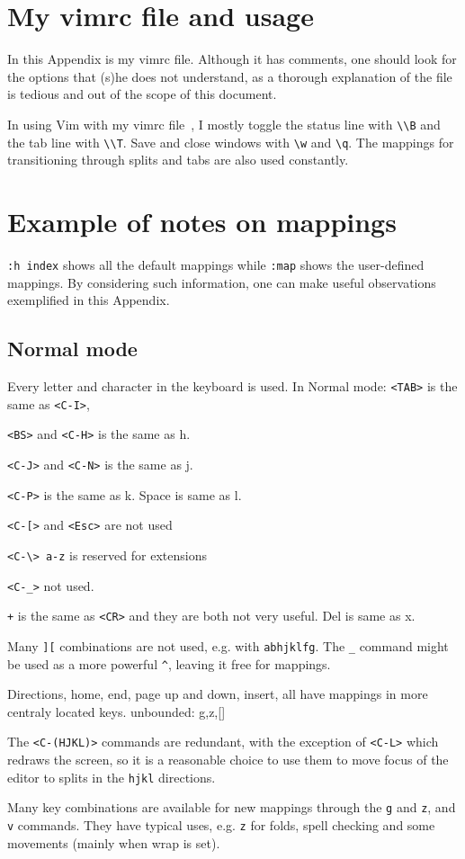 \documentclass{article}
\newcommand{\ttt}[1] {
	\texttt{<#1>}}
\newcommand{\tttt}[1] {
	\texttt{#1}}
\begin{document}
\section{My vimrc file and usage}
In this Appendix is my vimrc file.
Although it has comments, one should
look for the options that (s)he does
not understand, as a thorough explanation
of the file is tedious and out of the scope
of this document.

In using Vim with my vimrc file~\cite{vimrc},
I mostly toggle the status line with \texttt{\textbackslash\textbackslash B}
and the tab line with \texttt{\textbackslash\textbackslash T}.
Save and close windows with \texttt{\textbackslash w} and \texttt{\textbackslash q}.
The mappings for transitioning through splits and tabs
are also used constantly.

\section{Example of notes on mappings}\label{notes}
\texttt{:h index} shows all the default mappings
while \tttt{:map} shows the user-defined mappings.
By considering such information, one can make
useful observations exemplified in this Appendix.

\subsection{Normal mode}
Every letter and character in the keyboard is used.
In Normal mode: \ttt{TAB} is the same as \ttt{C-I},
\ttt{BS} and \ttt{C-H} is the same as h.
\ttt{C-J} and \ttt{C-N} is the same as j.
\ttt{C-P} is the same as k.
Space is same as l.
\ttt{C-[} and \ttt{Esc} are not used
\tttt{<C-\textbackslash> a-z} is reserved for extensions
\ttt{C-\_} not used.
\tttt{+} is the same as \ttt{CR} and they are both not very useful.
Del is same as x.

Many \tttt{][} combinations are not used, e.g.
with \tttt{abhjklfg}.
The \tttt{\_} command might be used as a more powerful \tttt{\^},
leaving it free for mappings.

Directions, home, end, page up and down, insert, all have mappings
in more centraly located keys.
unbounded: g,z,[]

The \ttt{C-(HJKL)} commands are redundant,
with the exception of \ttt{C-L} which redraws the screen,
so it is a reasonable choice to use them to move focus
of the editor to splits in the \tttt{hjkl} directions.

Many key combinations are available for new mappings through the \tttt{g}
and \tttt{z}, and \tttt{v} commands.
They have typical uses, e.g. \tttt{z} for folds,
spell checking and some movements (mainly when wrap is set).
\end{document}
